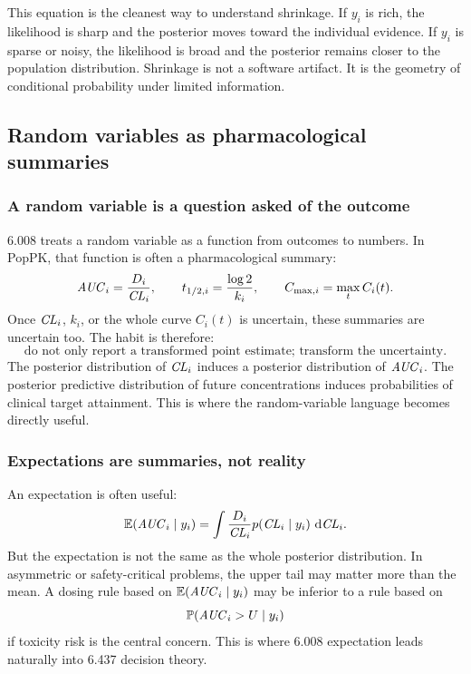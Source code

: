This equation is the cleanest way to understand shrinkage.  If \(y_i\) is rich, the likelihood is sharp and the posterior moves toward the individual evidence.  If \(y_i\) is sparse or noisy, the likelihood is broad and the posterior remains closer to the population distribution.  Shrinkage is not a software artifact.  It is the geometry of conditional probability under limited information.

\subsection{Random variables as pharmacological summaries}

\subsubsection*{A random variable is a question asked of the outcome}

6.008 treats a random variable as a function from outcomes to numbers.  In PopPK, that function is often a pharmacological summary:
\[
  \pksym{AUC}_i=\frac{D_i}{\pksym{CL}_i},
  \qquad
  t_{1/2,i}=\frac{\log 2}{k_i},
  \qquad
  C_{\max,i}=\max_t C_i(t).
\]
Once \(\pksym{CL}_i\), \(k_i\), or the whole curve \(C_i(t)\) is uncertain, these summaries are uncertain too.  The habit is therefore:
\[
  \text{do not only report a transformed point estimate; transform the uncertainty.}
\]
The posterior distribution of \(\pksym{CL}_i\) induces a posterior distribution of \(\pksym{AUC}_i\).  The posterior predictive distribution of future concentrations induces probabilities of clinical target attainment.  This is where the random-variable language becomes directly useful.

\subsubsection*{Expectations are summaries, not reality}

An expectation is often useful:
\[
  \E(\pksym{AUC}_i\mid y_i)
  =
  \int \frac{D_i}{\pksym{CL}_i}p(\pksym{CL}_i\mid y_i)\,\dd \pksym{CL}_i.
\]
But the expectation is not the same as the whole posterior distribution.  In asymmetric or safety-critical problems, the upper tail may matter more than the mean.  A dosing rule based on \(\E(\pksym{AUC}_i\mid y_i)\) may be inferior to a rule based on
\[
  \Prob(\pksym{AUC}_i>U\mid y_i)
\]
if toxicity risk is the central concern.  This is where 6.008 expectation leads naturally into 6.437 decision theory.

